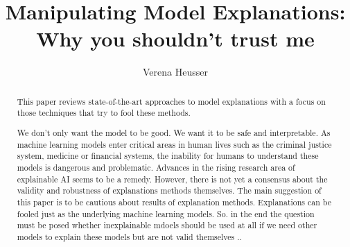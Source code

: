 \documentclass[sigconf]{acmart}
\begin{document}
\title{Manipulating Model Explanations: Why you shouldn't trust me}



\author{Verena Heusser}


\begin{abstract}
  This paper reviews state-of-the-art approaches to model explanations with a focus on those techniques that try to 
  fool these methods. 

  We don't only want the model to be good. We want it to be safe and interpretable. 
  As machine learning models enter critical areas in human lives such as the criminal justice system, medicine or financial systems, the inability for humans to understand these models is dangerous and problematic. Advances in the rising research area of explainable AI seems to be a remedy. However, there is not yet a consensus about the validity and robustness of explanations methods themselves. The main suggestion of this paper is to be cautious about results of explanation methods. Explanations can be fooled just as the underlying machine learning models. So. in the end the question must be posed whether inexplainable mdoels should be used at all if we need other models to explain these models but are not valid themselves .. %

\end{abstract}

\begin{CCSXML}
\end{CCSXML}


\end{document}
